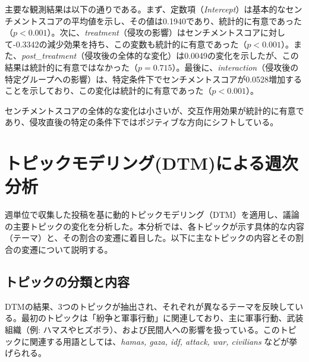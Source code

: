 \documentclass[11pt, a4j]{jreport}
\begin{document}
    \begin{table}[H]
    \centering
    \caption{センチメントスコアの変化に関するOLS回帰結果}
    \label{tab:wls_results}
    \end{table}

    主要な観測結果は以下の通りである。まず、定数項（\textit{Intercept}）は基本的なセンチメントスコアの平均値を示し、その値は0.1940であり、統計的に有意であった（$p < 0.001$）。次に、\textit{treatment}（侵攻の影響）はセンチメントスコアに対して-0.3342の減少効果を持ち、この変数も統計的に有意であった（$p < 0.001$）。また、\textit{post\_treatment}（侵攻後の全体的な変化）は0.0049の変化を示したが、この結果は統計的に有意ではなかった（$p = 0.715$）。最後に、\textit{interaction}（侵攻後の特定グループへの影響）は、特定条件下でセンチメントスコアが0.0528増加することを示しており、この変化は統計的に有意であった（$p < 0.001$）。
    
    センチメントスコアの全体的な変化は小さいが、交互作用効果が統計的に有意であり、侵攻直後の特定の条件下ではポジティブな方向にシフトしている。

    \section{トピックモデリング(DTM)による週次分析}

    週単位で収集した投稿を基に動的トピックモデリング（DTM）を適用し、議論の主要トピックの変化を分析した。本分析では、各トピックが示す具体的な内容（テーマ）と、その割合の変遷に着目した。以下に主なトピックの内容とその割合の変遷について説明する。

    \subsection{トピックの分類と内容}
    DTMの結果、3つのトピックが抽出され、それぞれが異なるテーマを反映している。最初のトピックは「紛争と軍事行動」に関連しており、主に軍事行動、武装組織（例: ハマスやヒズボラ）、および民間人への影響を扱っている。このトピックに関連する用語としては、\textit{hamas, gaza, idf, attack, war, civilians} などが挙げられる。
    
\end{document}
